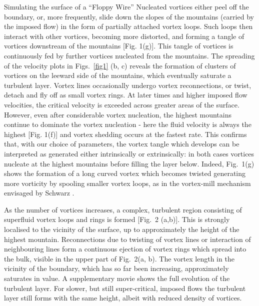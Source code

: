 \begin{chapter}{\label{cha:afm}Simulating the surface of a ``Floppy Wire''}
Nucleated vortices either peel off the boundary, or, more frequently, slide
down the slopes of the mountains (carried by the imposed flow) in the form of partially attached vortex loops.
Such loops then interact with other vortices, becoming more distorted, and forming a tangle of vortices downstream of the mountains [Fig. 1(g)].  This tangle of vortices is continuously fed by further vortices nucleated from the mountains.  The spreading of the velocity plots in Figs.~\ref{fig1} (b, c) reveals
the formation of clusters of vortices on the leeward side of the mountains, which eventually saturate a
turbulent layer.  Vortex lines occasionally undergo vortex reconnections, or twist, detach and fly off as small 
vortex rings. At later times and higher imposed flow velocities, the critical velocity is exceeded across greater areas of the surface.  However, even after considerable vortex nucleation, the highest mountains continue to dominate the vortex nucleation - here the fluid velocity is always the highest [Fig. 1(f)] and vortex shedding occurs at the fastest rate. This confirms that, with our choice of parameters,
the vortex tangle which develops can be interpreted as generated either
intrinsically or extrinsically: in both cases vortices nucleate 
at the highest mountains before filling the layer below.
Indeed, Fig.~1(g) shows the formation of a long curved
vortex which becomes twisted generating more vorticity  by spooling smaller vortex loops, 
as in the vortex-mill mechanism envisaged by Schwarz \cite{Schwarz-mill}.

As the number of vortices increases, a complex,
turbulent region consisting of superfluid vortex loops and rings is 
formed [Fig.~2 (a,b)].  This is strongly localised to the vicinity of the surface, up to approximately the height of the highest mountain. Reconnections due to twisting of vortex lines or interaction of neighbouring lines form a continuous ejection of vortex rings which spread into the bulk, visible in
the upper part of Fig.~2(a, b). The vortex length in the vicinity of the boundary, which has so far been increasing, approximately saturates in value. {A supplementary movie \cite{supp} shows the full evolution of the turbulent layer.}   For slower, but still super-critical, imposed flows the turbulent layer still forms with the same height, albeit with reduced density of vortices.


\end{chapter}
